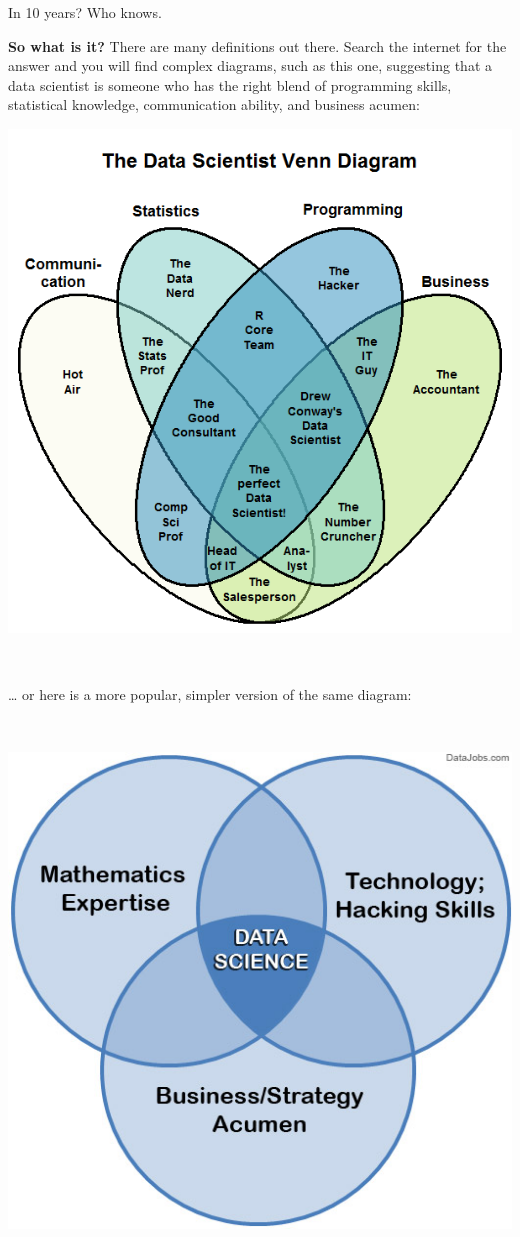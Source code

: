 \documentclass[]{book}
\begin{document}
In 10 years? Who knows.

\textbf{So what is it?} There are many definitions out there. Search the internet for the answer and you will find complex diagrams, such as this one, suggesting that a data scientist is someone who has the right blend of programming skills, statistical knowledge, communication ability, and business acumen:

\includegraphics{img/venn1.png}

~

\ldots{} or here is a more popular, simpler version of the same diagram:

~

\includegraphics{img/venn5.jpg}
\end{document}
